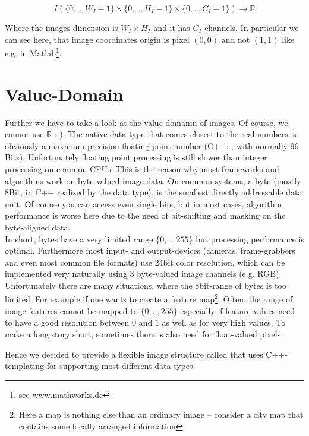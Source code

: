 \begin{equation}
  I(\{0,..,W_I-1\} \times{} \{0,..,H_I-1\} \times{} \{0,..,C_I-1\} ) \rightarrow \mathbb{R} 
\end{equation}


Where the images dimension is $W_I \times{}H_I$ and it has $C_I$ channels. In particular we can see here, that image coordinates origin is pixel $(0,0)$ and not $(1,1)$ like e.g. in Matlab\footnote{see www.mathworks.de}. 


\section{Value-Domain\label{sec:image-value-domain}}
Further we have to take a look at the value-domanin of images.
Of course, we cannot use $\mathbb{R}$ :-). The native data type that comes closest to the real numbers is obviously a maximum precision floating point number (C++: , with normally 96 Bits). Unfortunately floating point processing is still slower than integer processing on common CPUs. This is the reason why most frameworks and algorithms work on byte-valued image data. On common systems, a byte (mostly 8Bit, in C++ realized by the  data type), is the smallest directly addressable data unit. Of course you can access even single bits, but in most cases, algorithm performance is worse here due to the need of bit-shifting and masking on the byte-aligned data.\\
In short, bytes have a very limited range $\{0,..,255\}$ but processing performance is optimal. Furthermore most input- and output-devices (cameras, frame-grabbers and even most common file formats) use 24bit color resolution, which can be implemented very naturally using 3 byte-valued image channels (e.g. RGB).
Unfortunately there are many situations, where the 8bit-range of bytes is too limited. For example if one wants to create a feature map\footnote{Here a map is nothing else than an ordinary image -- consider a city map that contains some locally arranged information}. Often, the range of image features cannot be mapped to $\{0,..,255\}$ especially if feature values need to have a good resolution between $0$ and $1$ as well as for very high values. To make a long story short, sometimes there is also need for float-valued pixels.

Hence we decided to provide a flexible image structure called  that uses C++-templating for supporting most different data types.

